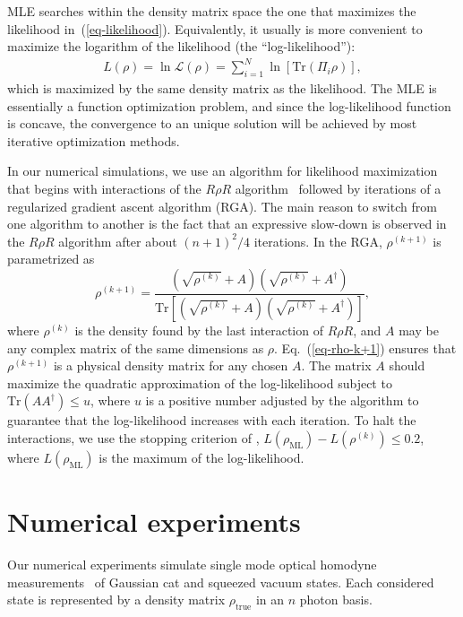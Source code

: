 \documentclass[
reprint,
superscriptaddress,
showpacs,
amsmath,
amssymb,
aps,
pra,
longbibliography
]{revtex4-1}
\begin{document}
MLE searches within the density matrix space the one that maximizes the likelihood in~(\ref{eq-likelihood}). Equivalently, it usually is more convenient to maximize the logarithm of the likelihood (the ``log-likelihood''):
\begin{eqnarray}
L (\rho) = \ln \mathcal{L} (\rho)= \sum_{i=1}^{N} \ln [\mathrm{Tr} (\Pi_i \rho)],
\end{eqnarray} 
which is maximized by the same density matrix as the likelihood. The MLE is essentially a function optimization problem, and since the log-likelihood function is concave, the convergence to an unique solution will be achieved by most iterative optimization methods.

In our numerical simulations, we use an algorithm for likelihood maximization that begins with interactions of the $R\rho R$ algorithm~\cite{Rehacek2007} followed by iterations of a regularized gradient ascent algorithm (RGA). The main reason to switch from one algorithm to another is the fact that an expressive slow-down is observed in the $R\rho R$ algorithm after about $(n+1)^2/4$ iterations. In the RGA, $\rho^{(k+1)}$ is parametrized as 
\begin{equation}
  \rho^{(k+1)}=\frac{\left(\sqrt{\rho^{(k)}}+A\right)\left(\sqrt{\rho^{(k)}}+A^{\dagger}\right)}{\mathrm{Tr}\left[\left(\sqrt{\rho^{(k)}}+A\right)\left(\sqrt{\rho^{(k)}}+A^{\dagger}\right)\right]},
\label{eq-rho-k+1}
\end{equation}
where $\rho^{(k)}$ is the density found by the last interaction of $R \rho R$, and $A$ may be any complex matrix of the same dimensions as $\rho$. Eq.~(\ref{eq-rho-k+1}) ensures that $\rho^{(k+1)}$ is a physical density matrix for any chosen $A$. The matrix $A$ should maximize the quadratic
approximation of the log-likelihood subject to $\text{Tr}(AA^{\dagger})\leq u$, where $u$ is a positive number adjusted by the algorithm to guarantee that the log-likelihood increases with each iteration. To halt the interactions, we use the stopping criterion of \cite{Glancy2012}, $L(\rho_{\text{ML}})-L(\rho^{(k)})\leq 0.2$, where $L(\rho_{\text{ML}})$ is the maximum of the log-likelihood.

\section{Numerical experiments}
\label{numerical-experiments}
Our numerical experiments simulate single mode optical homodyne
measurements~\cite{Lvovsky2009} of Gaussian cat and squeezed vacuum states. 
Each considered state is represented by a density matrix $\rho_{\mathrm{true}}$ in an $n$ photon basis. 
\end{document}
